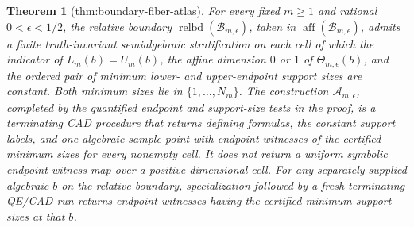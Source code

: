 \documentclass{article}
\newtheorem{theorem}{Theorem}
\begin{document}
\begin{theorem}[thm:boundary-fiber-atlas]\label{thm:boundary-fiber-atlas}
For every fixed \(m\geq1\) and rational \(0<\epsilon<1/2\), the relative boundary \(\operatorname{relbd}(\mathcal B_{m,\epsilon})\), taken in \(\operatorname{aff}(\mathcal B_{m,\epsilon})\), admits a finite truth-invariant semialgebraic stratification on each cell of which the indicator of \(L_m(b)=U_m(b)\), the affine dimension \(0\) or \(1\) of \(\Theta_{m,\epsilon}(b)\), and the ordered pair of minimum lower- and upper-endpoint support sizes are constant.  Both minimum sizes lie in \(\{1,\ldots,N_m\}\).  The construction \(\mathcal A_{m,\epsilon}\), completed by the quantified endpoint and support-size tests in the proof, is a terminating CAD procedure that returns defining formulas, the constant support labels, and one algebraic sample point with endpoint witnesses of the certified minimum sizes for every nonempty cell.  It does not return a uniform symbolic endpoint-witness map over a positive-dimensional cell.  For any separately supplied algebraic \(b\) on the relative boundary, specialization followed by a fresh terminating QE/CAD run returns endpoint witnesses having the certified minimum support sizes at that \(b\).
\end{theorem}
\end{document}
